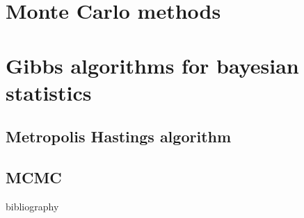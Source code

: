 \documentclass{article}\usepackage[]{graphicx}\usepackage[]{xcolor}
\begin{document}
\section{Monte Carlo methods}

\section{Gibbs algorithms for bayesian statistics}

\subsection{Metropolis Hastings algorithm}

\subsection{MCMC}


\newpage
%
bibliography
\end{document}
